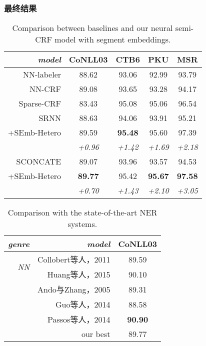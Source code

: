 \subsubsection{最终结果}

\begin{table}[t]
	\centering
	\begin{tabular}{r||c |c c c}
		\hline
		\it  model & CoNLL03 & CTB6 & PKU & MSR \\
		\hline
		\sc NN-labeler & 88.62 & 93.06 & 92.99 & 93.79 \\
		\sc NN-CRF & 89.08 & 93.65 & 93.28 & 94.17 \\
		\hline
		\sc Sparse-CRF & 83.43 & 95.08 & 95.06 & 96.54 \\
		\hline
		SRNN &88.63 & 94.06 & 93.91 & 95.21 \\
		\sc +SEmb-Hetero & 89.59 &\bf 95.48 & 95.60 & 97.39 \\
		&\it +0.96 &\it +1.42 &\it +1.69 &\it +2.18 \\
		\hdashline[1pt/3pt]
		SCONCATE & 89.07 & 93.96 & 93.57 & 94.53 \\
		\sc +SEmb-Hetero & \bf 89.77 & 95.42 &\bf 95.67 &\bf 97.58 \\
		&\it +0.70 &\it +1.43 &\it +2.10 &\it +3.05 \\
		\hline
	\end{tabular}
	\caption{Comparison between baselines and our neural semi-CRF model with segment embeddings.}
	\label{tbl:semicrf:seg-result}
\end{table}

\begin{table}[t]
	\centering
	\begin{tabular}{r|r||c}
		\hline
		\it genre & \it model & CoNLL03 \\
		\hline
		\multirow{2}{*}{\it NN} & Collobert等人，2011\cite{Collobert:2011:NLP:1953048.2078186} & 89.59 \\
		& Huang等人，2015\cite{DBLP:journals/corr/HuangXY15} & 90.10 \\
		\hdashline[1pt/3pt]
		\multirow{3}{*}{\it non-NN} & Ando与Zhang，2005\cite{Ando:2005:FLP:1046920.1194905} & 89.31 \\
		& Guo等人，2014\cite{guo-EtAl:2014:EMNLP2014} & 88.58 \\
		& Passos等人，2014\cite{passos-kumar-mccallum:2014:W14-16} & \bf 90.90 \\
		\hline
		\multicolumn{2}{r||}{our best} & 89.77 \\
		\hline
	\end{tabular}
	\caption{Comparison with the state-of-the-art NER systems.}\label{tbl:semicrf:ne-stoa}
\end{table}

